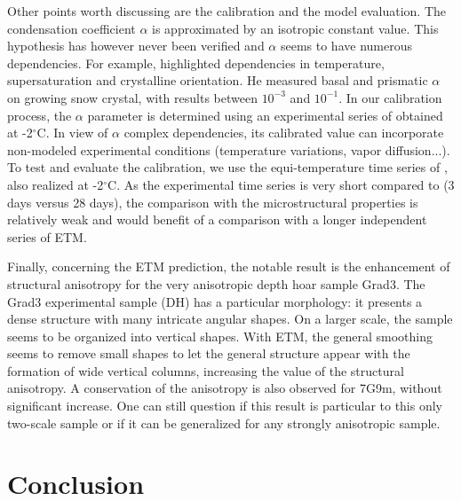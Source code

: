 \documentclass[draft,ms]{agujournal2019}
\begin{document}
Other points worth discussing are the calibration and the model evaluation. The condensation coefficient $\alpha$ is approximated by an isotropic constant value. This hypothesis has however never been verified and $\alpha$ seems to have numerous dependencies. For example,  highlighted dependencies in temperature, supersaturation and crystalline orientation. He measured basal and prismatic $\alpha$ on growing snow crystal, with results between $10^{-3}$ and $10^{-1}$.
In our calibration process, the $\alpha$ parameter is determined using an experimental series of  obtained at -2$^\circ$C. In view of $\alpha$ complex dependencies, its calibrated value can incorporate non-modeled experimental conditions (temperature variations, vapor diffusion...).
To test and evaluate the calibration, we use the equi-temperature time series of , also realized at -2$^\circ$C. As the experimental time series is very short compared to  (3 days versus 28 days), the comparison with the microstructural properties is relatively weak and would benefit of a comparison with a longer independent series of ETM. 

Finally, concerning the ETM prediction, the notable result is the enhancement of structural anisotropy for the very anisotropic depth hoar sample Grad3. The Grad3 experimental sample (DH) has a particular morphology: it presents a dense structure with many intricate angular shapes. On a larger scale, the sample seems to be organized into vertical shapes. With ETM, the general smoothing seems to remove small shapes to let the general structure appear with the formation of wide vertical columns, increasing the value of the structural anisotropy. A conservation of the anisotropy is also observed for 7G9m, without significant increase. One can still question if this result is particular to this only two-scale sample or if it can be generalized for any strongly anisotropic sample. 

\section{Conclusion}
\label{sec:conclusion}
\end{document}
